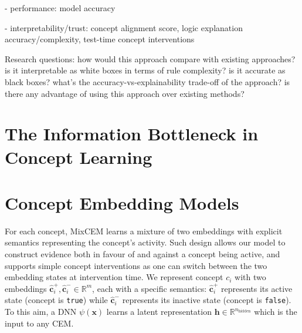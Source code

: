 \documentclass[withindex,glossary]{cam-thesis}
\theoremstyle{plain}
\theoremstyle{definition}
\theoremstyle{remark}
\begin{document}
- performance: model accuracy

- interpretability/trust: concept alignment score, logic explanation accuracy/complexity, test-time concept interventions

Research questions: how would this approach compare with existing approaches? is it interpretable as white boxes in terms of rule complexity? is it accurate as black boxes? what's the accuracy-vs-explainability trade-off of the approach? is there any advantage of using this approach over existing methods?

\section{The Information Bottleneck in Concept Learning}

\section{Concept Embedding Models}
For each concept, MixCEM learns a mixture of two embeddings with explicit semantics representing the concept's activity. Such design allows our model to construct evidence both in favour of and against a concept being active, and supports simple concept interventions as one can switch between the two embedding states at intervention time.
%
%
We represent concept $c_i$ with two embeddings $\hat{\textbf{c}}^+_i, \hat{\textbf{c}}^-_i \in \mathbb{R}^m$, each with a specific semantics: $\hat{\textbf{c}}^+_i$ represents its active state (concept is \texttt{true}) while $\hat{\textbf{c}}^-_i$ represents its inactive state (concept is \texttt{false}). To this aim, a DNN $\psi(\mathbf{x})$ learns a latent representation $\mathbf{h} \in \mathbb{R}^{n_\text{hidden}}$ which is the input to any CEM. 
\end{document}
